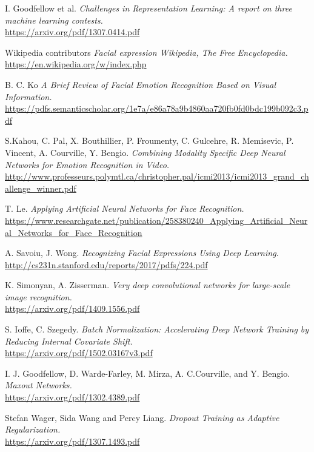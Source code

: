 \newpage
\begin{thebibliography}{6}
	I. Goodfellow et al.
	\textit{Challenges in Representation Learning: A report on three machine learning contests.}\\
	\url{https://arxiv.org/pdf/1307.0414.pdf}
	
	Wikipedia contributors
	\textit{Facial expression {Wikipedia}{,} The Free Encyclopedia.}\\
	\url{https://en.wikipedia.org/w/index.php}
	
	B. C. Ko
	\textit{A Brief Review of Facial Emotion Recognition Based on Visual Information.}\\
	\url{https://pdfs.semanticscholar.org/1e7a/e86a78a9b4860aa720fb0fd0bdc199b092c3.pdf}
	
	S.Kahou, C. Pal, X. Bouthillier, P.  Froumenty,  C. Gulcehre,  R.  Memisevic, P.  Vincent,  A.  Courville,  Y.  Bengio.
	\textit{Combining Modality Specific Deep Neural Networks for Emotion Recognition in Video.}\\
	\url{http://www.professeurs.polymtl.ca/christopher.pal/icmi2013/icmi2013_grand_challenge_winner.pdf}
	
	T. Le.
	\textit{Applying Artificial Neural Networks for Face Recognition.}\\
	\url{https://www.researchgate.net/publication/258380240_Applying_Artificial_Neural_Networks_for_Face_Recognition}
	
	A. Savoiu, J. Wong.
	\textit{Recognizing Facial Expressions Using Deep Learning.}\\
	\url{http://cs231n.stanford.edu/reports/2017/pdfs/224.pdf}
	
	K. Simonyan, A. Zisserman. 
	\textit{Very deep convolutional networks for large-scale image recognition.}\\
	\url{https://arxiv.org/pdf/1409.1556.pdf}
	
	S. Ioffe, C. Szegedy.
	\textit{Batch Normalization: Accelerating Deep Network Training by Reducing Internal Covariate Shift.}\\
	\url{https://arxiv.org/pdf/1502.03167v3.pdf}
	
	I. J. Goodfellow, D. Warde-Farley, M. Mirza, A. C.Courville, and Y. Bengio.
	\textit{Maxout Networks.}\\
	\url{https://arxiv.org/pdf/1302.4389.pdf}
	
	Stefan Wager,  Sida Wang and Percy Liang.
	\textit{Dropout Training as Adaptive Regularization.}\\
	\url{https://arxiv.org/pdf/1307.1493.pdf}
	

\end{thebibliography}
